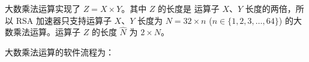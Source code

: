 \documentclass[main\_\_CN.tex]{subfiles}
\begin{document}
大数乘法运算实现了 \begin{math}Z = X \times Y\end{math}。其中 \begin{math}Z\end{math} 的长度是
运算子 \begin{math}X\end{math}、\begin{math}Y\end{math} 长度的两倍，所以 RSA 加速器只支持运算子 $X$、$Y$ 长度为 \begin{math}N = 32 \times n \end{math} (\begin{math}n \in \{ 1, 2, 3, \dots, 64\} \end{math}) 的大数乘法运算。运算子 \begin{math}Z\end{math} 的长度 \begin{math}\hat{N}\end{math} 为 \begin{math}2 \times N\end{math}。


大数乘法运算的软件流程为：
\end{document}
